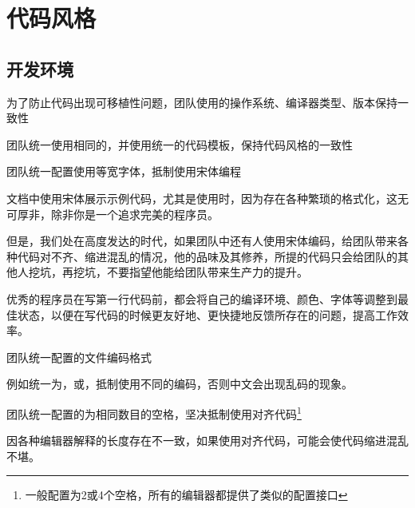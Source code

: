 \begin{savequote}[45mm]
\end{savequote}

\chapter{代码风格} 
\label{ch:physical-design}

\section{开发环境}

\begin{content}

\begin{regulation}
为了防止代码出现可移植性问题，团队使用的操作系统、编译器类型、版本保持一致性
\end{regulation}

\begin{regulation}
团队统一使用相同的，并使用统一的代码模板，保持代码风格的一致性
\end{regulation}

\begin{regulation}
团队统一配置使用等宽字体，抵制使用宋体编程
\end{regulation}

文档中使用宋体展示示例代码，尤其是使用时，因为存在各种繁琐的格式化，这无可厚非，除非你是一个追求完美的程序员。

但是，我们处在高度发达的时代，如果团队中还有人使用宋体编码，给团队带来各种代码对不齐、缩进混乱的情况，他的品味及其修养，所提的代码只会给团队的其他人挖坑，再挖坑，不要指望他能给团队带来生产力的提升。

优秀的程序员在写第一行代码前，都会将自己的编译环境、颜色、字体等调整到最佳状态，以便在写代码的时候更友好地、更快捷地反馈所存在的问题，提高工作效率。

\begin{regulation}
团队统一配置的文件编码格式
\end{regulation}

例如统一为，或，抵制使用不同的编码，否则中文会出现乱码的现象。

\begin{regulation}
团队统一配置的为相同数目的空格，坚决抵制使用对齐代码\footnote{一般配置为2或4个空格，所有的编辑器都提供了类似的配置接口}
\end{regulation}

因各种编辑器解释的长度存在不一致，如果使用对齐代码，可能会使代码缩进混乱不堪。

\end{content}

